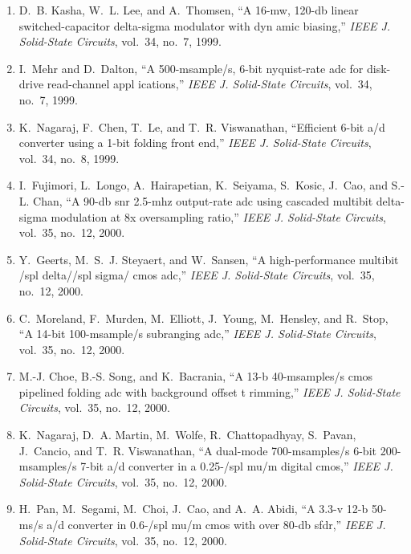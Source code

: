\begin{enumerate}
\item
D.~B. Kasha, W.~L. Lee, and A.~Thomsen, ``A 16-mw, 120-db linear
  switched-capacitor delta-sigma modulator with dyn amic biasing,''
  \emph{{IEEE} J. Solid-State Circuits}, vol.~34, no.~7, 1999.

\item
I.~Mehr and D.~Dalton, ``A 500-msample/s, 6-bit nyquist-rate adc for disk-drive
  read-channel appl ications,'' \emph{{IEEE} J. Solid-State Circuits}, vol.~34,
  no.~7, 1999.

\item
K.~Nagaraj, F.~Chen, T.~Le, and T.~R. Viswanathan, ``Efficient 6-bit a/d
  converter using a 1-bit folding front end,'' \emph{{IEEE} J. Solid-State
  Circuits}, vol.~34, no.~8, 1999.

\item
I.~Fujimori, L.~Longo, A.~Hairapetian, K.~Seiyama, S.~Kosic, J.~Cao, and S.-L.
  Chan, ``A 90-db snr 2.5-mhz output-rate adc using cascaded multibit
  delta-sigma modulation at 8x oversampling ratio,'' \emph{{IEEE} J.
  Solid-State Circuits}, vol.~35, no.~12, 2000.

\item
Y.~Geerts, M.~S.~J. Steyaert, and W.~Sansen, ``A high-performance multibit /spl
  delta//spl sigma/ cmos adc,'' \emph{{IEEE} J. Solid-State Circuits}, vol.~35,
  no.~12, 2000.

\item
C.~Moreland, F.~Murden, M.~Elliott, J.~Young, M.~Hensley, and R.~Stop, ``A
  14-bit 100-msample/s subranging adc,'' \emph{{IEEE} J. Solid-State Circuits},
  vol.~35, no.~12, 2000.

\item
M.-J. Choe, B.-S. Song, and K.~Bacrania, ``A 13-b 40-msamples/s cmos pipelined
  folding adc with background offset t rimming,'' \emph{{IEEE} J. Solid-State
  Circuits}, vol.~35, no.~12, 2000.

\item
K.~Nagaraj, D.~A. Martin, M.~Wolfe, R.~Chattopadhyay, S.~Pavan, J.~Cancio, and
  T.~R. Viswanathan, ``A dual-mode 700-msamples/s 6-bit 200-msamples/s 7-bit
  a/d converter in a 0.25-/spl mu/m digital cmos,'' \emph{{IEEE} J. Solid-State
  Circuits}, vol.~35, no.~12, 2000.

\item
H.~Pan, M.~Segami, M.~Choi, J.~Cao, and A.~A. Abidi, ``A 3.3-v 12-b 50-ms/s a/d
  converter in 0.6-/spl mu/m cmos with over 80-db sfdr,'' \emph{{IEEE} J.
  Solid-State Circuits}, vol.~35, no.~12, 2000.


\end{enumerate}
